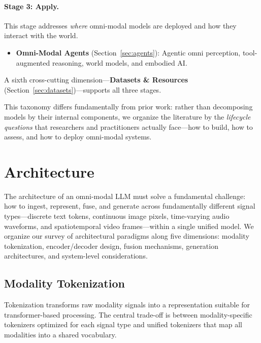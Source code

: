 \documentclass{article}
\begin{document}
\paragraph{Stage 3: Apply.}
This stage addresses \emph{where} omni-modal models are deployed and how they interact with the world.
\begin{itemize}
    \item \textbf{Omni-Modal Agents} (Section~\ref{sec:agents}): Agentic omni perception, tool-augmented reasoning, world models, and embodied AI.
\end{itemize}

A sixth cross-cutting dimension---\textbf{Datasets \& Resources} (Section~\ref{sec:datasets})---supports all three stages.

This taxonomy differs fundamentally from prior work: rather than decomposing models by their internal components, we organize the literature by the \emph{lifecycle questions} that researchers and practitioners actually face---how to build, how to assess, and how to deploy omni-modal systems.

\section{Architecture}
\label{sec:architecture}

The architecture of an omni-modal LLM must solve a fundamental challenge: how to ingest, represent, fuse, and generate across fundamentally different signal types---discrete text tokens, continuous image pixels, time-varying audio waveforms, and spatiotemporal video frames---within a single unified model.
We organize our survey of architectural paradigms along five dimensions: modality tokenization, encoder/decoder design, fusion mechanisms, generation architectures, and system-level considerations.

\subsection{Modality Tokenization}

Tokenization transforms raw modality signals into a representation suitable for transformer-based processing.
The central trade-off is between modality-specific tokenizers optimized for each signal type and unified tokenizers that map all modalities into a shared vocabulary.
\end{document}
